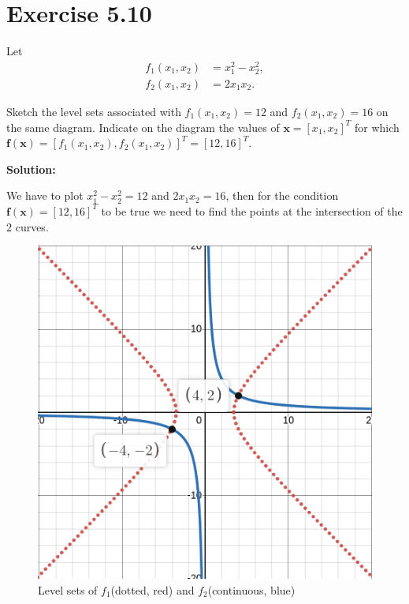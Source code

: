 \documentclass{article}
\begin{document}
\section*{Exercise 5.10}
Let
\begin{align*}
	f_1(x_1,x_2)&=x_1^2-x_2^2,\\
	f_2(x_1,x_2)&=2x_1x_2.
\end{align*}

Sketch the level sets associated with $f_1(x_1,x_2)=12$ and $f_2(x_1,x_2)=16$
on the same diagram. Indicate on the diagram the values of
$\boldsymbol{x}=[x_1,x_2]^T$ for which
$\boldsymbol{f}(\boldsymbol{x})=[f_1(x_1,x_2),f_2(x_1,x_2)]^T=[12,16]^T$.

\textbf{Solution:}

We have to plot $x_1^2-x_2^2=12$ and $2x_1x_2=16$, then for the condition
$\boldsymbol{f}(\boldsymbol{x})=[12,16]^T$ to be true we need to find the
points at the intersection of the 2 curves.

\begin{figure}[h]
	\caption{Level sets of $f_1$(dotted, red) and $f_2$(continuous, blue)}
	\includegraphics[width=\textwidth]{sketch-hw-1.png}
\end{figure}
\end{document}
